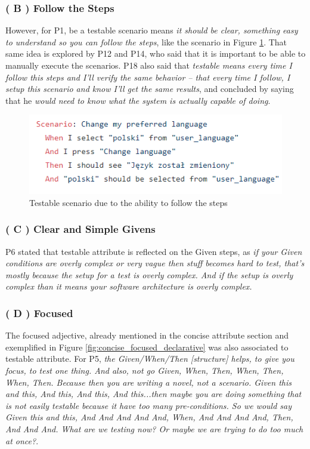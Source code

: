 \subsubsection{\textbf{( B ) Follow the Steps}}
However, for P1, be a testable scenario means \textit{it should be clear, something easy to understand so you can follow the steps}, like the scenario in Figure \ref{fig:testable_as_can_follow_steps}. That same idea is explored by P12 and P14, who said that it is important to be able to manually execute the scenarios. P18 also said that \textit{testable means every time I follow this steps and I'll verify the same behavior -- that every time I follow, I setup this scenario and know I'll get the same results}, and concluded by saying that he \textit{would need to know what the system is actually capable of doing}.

\begin{figure}[t]
	\centering
	\includegraphics[scale=0.8]{images/change_settings_feature_testable_example_P1}
	\caption[\hspace{2mm}Testable scenario due to the ability to follow the steps]{Testable scenario due to the ability to follow the steps}
	\label{fig:testable_as_can_follow_steps}
\end{figure}

\subsubsection{\textbf{( C ) Clear and Simple Givens}}
P6 stated that testable attribute is reflected on the Given steps, as \textit{if your Given conditions are overly complex or very vague then stuff becomes hard to test, that's mostly because the setup for a test is overly complex. And if the setup is overly complex than it means your software architecture is overly complex.}

\subsubsection{\textbf{( D ) Focused}}
The focused adjective, already mentioned in the concise attribute section and exemplified in Figure \ref{fig:concise_focused_declarative} was also associated to testable attribute. For P5, \textit{the Given/When/Then [structure] helps, to give you focus, to test one thing. And also, not go Given, When, Then, When, Then, When, Then. Because then you are writing a novel, not a scenario. Given this and this, And this, And this, And this...then maybe you are doing something that is not easily testable because it have too many pre-conditions. So we would say Given this and this, And And And And And, When, And And And And, Then, And And And. What are we testing now? Or maybe we are trying to do too much at once?}.

